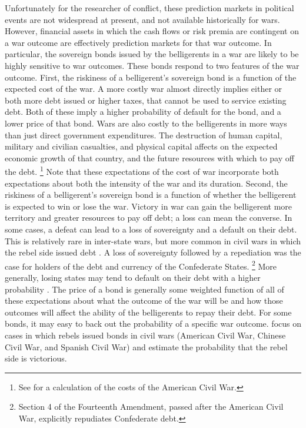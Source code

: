 Unfortunately for the researcher of conflict, these prediction markets in political events are not widespread at present, and not available historically for wars.
However, financial assets in which the cash flows or risk premia are contingent on a war outcome are effectively prediction markets for that war outcome.
In particular, the sovereign bonds issued by the belligerents in a war are likely to be highly sensitive to war outcomes.
These bonds respond to two features of the war outcome.
First, the riskiness of a belligerent's sovereign bond is a function of the expected cost of the war.
A more costly war almost directly implies either or both more debt issued or higher taxes, that cannot be used to service existing debt.
Both of these imply a higher probability of default for the bond, and a lower price of that bond.
Wars are also costly to the belligerents in more ways than just direct government expenditures.
The destruction of human capital, military and civilian casualties, and physical capital affects on the expected economic growth of that country, and the future resources with which to pay off the debt.%
\footnote{See \textcite{GoldinLewis1975} for a calculation of the costs of the American Civil War.}
Note that these expectations of the cost of war incorporate both expectations about both the intensity of the war and its duration.
Second, the riskiness of a belligerent's sovereign bond is a function of whether the belligerent is expected to win or lose the war.
Victory in war can gain the belligerent more territory and greater resources to pay off debt; a loss can mean the converse.
In some cases, a defeat can lead to a loss of sovereignty and a default on their debt.
This is relatively rare in inter-state wars, but more common in civil wars in which the rebel side issued debt \parencite{HaberMitchenerOosterlinckEtAl2015}.
A loss of sovereignty followed by a repediation was the case for holders of the debt and currency of the Confederate States.%
\footnote{Section 4 of the Fourteenth Amendment, passed after the American Civil War, explicitly repudiates Confederate debt.}
More generally, losing states may tend to default on their debt with a higher probability \parencite{Slantchev2012a}.
The price of a bond is generally some weighted function of all of these expectations about what the outcome of the war will be and how those outcomes will affect the ability of the belligerents to repay their debt.
For some bonds, it may easy to back out the probability of a specific war outcome.
\textcite{HaberMitchenerOosterlinckEtAl2015} focus on cases in which rebels issued bonds in civil wars (American Civil War, Chinese Civil War, and Spanish Civil War) and estimate the probability that the rebel side is victorious.
